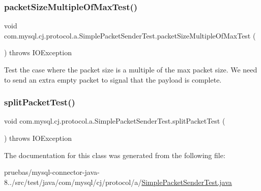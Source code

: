 \mbox{\label{classcom_1_1mysql_1_1cj_1_1protocol_1_1a_1_1_simple_packet_sender_test_a5936ffe2c8c3738af9838f7fa5a05624}} 
\subsubsection{\texorpdfstring{packet\+Size\+Multiple\+Of\+Max\+Test()}{packetSizeMultipleOfMaxTest()}}
{\footnotesize\ttfamily void com.\+mysql.\+cj.\+protocol.\+a.\+Simple\+Packet\+Sender\+Test.\+packet\+Size\+Multiple\+Of\+Max\+Test (\begin{DoxyParamCaption}{ }\end{DoxyParamCaption}) throws I\+O\+Exception}

Test the case where the packet size is a multiple of the max packet size. We need to send an extra empty packet to signal that the payload is complete. \mbox{\label{classcom_1_1mysql_1_1cj_1_1protocol_1_1a_1_1_simple_packet_sender_test_a2e967f47da2c1c278edc1d355c9d4a89}} 
\subsubsection{\texorpdfstring{split\+Packet\+Test()}{splitPacketTest()}}
{\footnotesize\ttfamily void com.\+mysql.\+cj.\+protocol.\+a.\+Simple\+Packet\+Sender\+Test.\+split\+Packet\+Test (\begin{DoxyParamCaption}{ }\end{DoxyParamCaption}) throws I\+O\+Exception}



The documentation for this class was generated from the following file\+:\begin{DoxyCompactItemize}
\item 
pruebas/mysql-\/connector-\/java-\/8../src/test/java/com/mysql/cj/protocol/a/\mbox{\hyperlink{_simple_packet_sender_test_8java}{Simple\+Packet\+Sender\+Test.\+java}}\end{DoxyCompactItemize}
